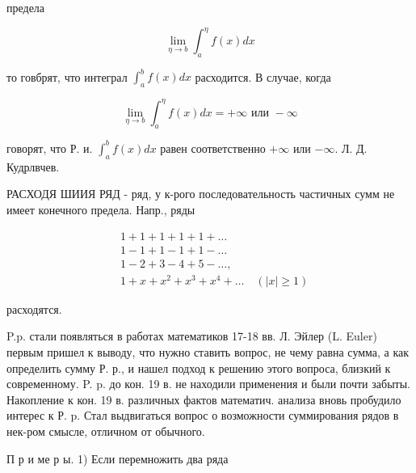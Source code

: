 \documentclass[10pt]{article}
\begin{document}
предела



\[

\lim _{\eta \rightarrow b} \int_{a}^{\eta} f(x) d x

\]



то говбрят, что интеграл $\int_{a}^{b} f(x) d x$ расходится. В случае, когда



\[

\lim _{\eta \rightarrow b} \int_{a}^{\eta} f(x) d x=+\infty \text { или }-\infty

\]



говорят, что Р. и. $\int_{a}^{b} f(x) d x$ равен соответственно $+\infty$ или $-\infty$. Л. Д. Кудрлвчев.



РАСХОДЯ ШИИЯ РЯД - ряд, у к-рого последовательность частичных сумм не имеет конечного предела. Напр., ряды



\[

\begin{aligned}

& 1+1+1+1+1+\ldots \\

& 1-1+1-1+1-\ldots \\

& 1-2+3-4+5-\ldots, \\

& 1+x+x^{2}+x^{3}+x^{4}+\ldots \quad(|x| \geqslant 1)

\end{aligned}

\]



расходятся.



P.p. стали появляться в работах математиков 17-18 вв. Л. Эйлер (L. Euler) первым пришел к выводу, что нужно ставить вопрос, не чему равна сумма, а как определить сумму Р. р., и нашел подход к решению этого вопроса, близкий к современному. P. p. до кон. 19 в. не находили применения и были почти забыты. Накопление к кон. 19 в. различных фактов математич. анализа вновь пробудило интерес к Р. p. Стал выдвигаться вопрос о возможности суммирования рядов в нек-ром смысле, отличном от обычного.



П р и ме р ы. 1) Если перемножить два ряда
\end{document}
